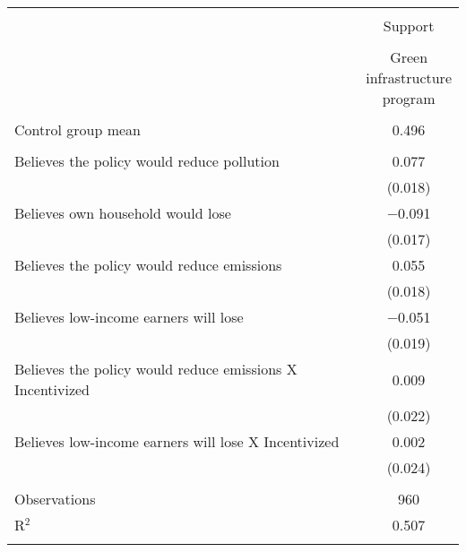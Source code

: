 
\begin{tabular}{@{\extracolsep{5pt}}lc} 
\\[-1.8ex]\hline 
\hline \\[-1.8ex] 
 & \multicolumn{1}{c}{Support} \\ 
\cline{2-2} 
\\[-1.8ex] & \makecell{Green\\infrastructure\\program} \\ 
\hline \\[-1.8ex] 
Control group mean & 0.496  \\ \hline \\[-1.8ex]
 Believes the policy would reduce pollution & 0.077 \\ 
  & (0.018) \\ 
  Believes own household would lose & $-$0.091 \\ 
  & (0.017) \\ 
  Believes the policy would reduce emissions & 0.055 \\ 
  & (0.018) \\ 
  Believes low-income earners will lose & $-$0.051 \\ 
  & (0.019) \\ 
  Believes the policy would reduce emissions X Incentivized & 0.009 \\ 
  & (0.022) \\ 
  Believes low-income earners will lose X Incentivized & 0.002 \\ 
  & (0.024) \\ 
 \hline \\[-1.8ex] 

Observations & 960 \\ 
R$^{2}$ & 0.507 \\ 
\hline 
\hline \\[-1.8ex] 
\end{tabular} 